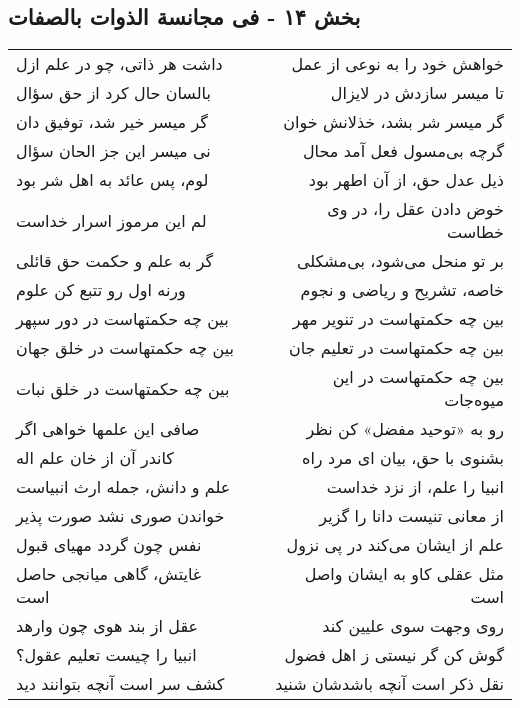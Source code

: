 \begin{center}
\section*{بخش ۱۴ - فی مجانسة الذوات بالصفات}
\label{sec:014}
\begin{longtable}{l p{0.5cm} r}
داشت هر ذاتی، چو در علم ازل
&&
خواهش خود را به نوعی از عمل
\\
بالسان حال کرد از حق سؤال
&&
تا میسر سازدش در لایزال
\\
گر میسر خیر شد، توفیق دان
&&
گر میسر شر بشد، خذلانش خوان
\\
نی میسر این جز الحان سؤال
&&
گرچه بی‌مسول فعل آمد محال
\\
لوم، پس عائد به اهل شر بود
&&
ذیل عدل حق، از آن اطهر بود
\\
لم این مرموز اسرار خداست
&&
خوض دادن عقل را، در وی خطاست
\\
گر به علم و حکمت حق قائلی
&&
بر تو منحل می‌شود، بی‌مشکلی
\\
ورنه اول رو تتبع کن علوم
&&
خاصه، تشریح و ریاضی و نجوم
\\
بین چه حکمتهاست در دور سپهر
&&
بین چه حکمتهاست در تنویر مهر
\\
بین چه حکمتهاست در خلق جهان
&&
بین چه حکمتهاست در تعلیم جان
\\
بین چه حکمتهاست در خلق نبات
&&
بین چه حکمتهاست در این میوه‌جات
\\
صافی این علمها خواهی اگر
&&
رو به «توحید مفضل» کن نظر
\\
کاندر آن از خان علم اله
&&
بشنوی با حق، بیان ای مرد راه
\\
علم و دانش، جمله ارث انبیاست
&&
انبیا را علم، از نزد خداست
\\
خواندن صوری نشد صورت پذیر
&&
از معانی تنیست دانا را گزیر
\\
نفس چون گردد مهیای قبول
&&
علم از ایشان می‌کند در پی نزول
\\
غایتش، گاهی میانجی حاصل است
&&
مثل عقلی کاو به ایشان واصل است
\\
عقل از بند هوی چون وارهد
&&
روی وجهت سوی علیین کند
\\
انبیا را چیست تعلیم عقول؟
&&
گوش کن گر نیستی ز اهل فضول
\\
کشف سر است آنچه بتوانند دید
&&
نقل ذکر است آنچه باشدشان شنید
\\
\end{longtable}
\end{center}
